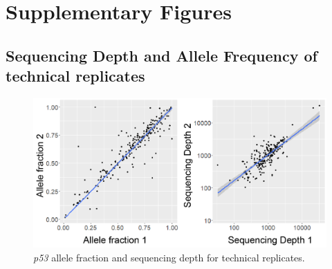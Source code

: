 
\chapter{Supplementary Figures}
\section{Sequencing Depth and Allele Frequency of technical replicates}
\begin{figure}
    \centering
    \includegraphics{Chapter2/Figs/Raster/p53_allele.png}
    \caption{\textit{p53} allele fraction and sequencing depth for technical replicates.}
    \label{fig:p53_allele}
\end{figure}